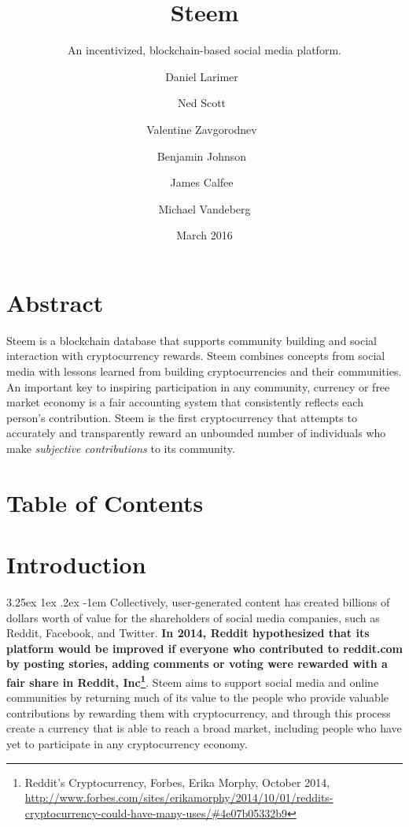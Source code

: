 \documentclass{article}
\title{Steem}
\subtitle{An incentivized, blockchain-based social media platform.}
\date{March 2016}
\author{
    Daniel Larimer\
    \and
    Ned Scott\
    \and
    Valentine Zavgorodnev\
    \and
    Benjamin Johnson\
    \and
    James Calfee\
    \and
    Michael Vandeberg
    }
\makeatletter
\renewcommand\paragraph{\@startsection{paragraph}{5}{\z@}%
  {3.25ex \@plus1ex \@minus.2ex}%
  {-1em}%
  {\normalfont\normalsize\bfseries}}
\makeatother
\begin{document}
    \renewcommand \thesection{\roman{section}}

    \maketitle

    \newpage

    \section{Abstract}

        Steem is a blockchain database that supports community building and
social interaction with cryptocurrency rewards. Steem combines concepts from
social media with lessons learned from building cryptocurrencies and their
communities. An important key to inspiring participation in any community,
currency or free market economy is a fair accounting system that
consistently reflects each person's contribution. Steem is the first
cryptocurrency that attempts to accurately and transparently reward an
unbounded number of individuals who make \textit{subjective contributions}
to its community.

    \newpage

    \section{Table of Contents}

    \tableofcontents

    \newpage

    \setcounter{section}{0}

    \renewcommand \thesection{\arabic{section}}

    \section{Introduction}

        \paragraph{}
            Collectively, user-generated content has created billions of
dollars worth of value for the shareholders of social media companies, such
as Reddit, Facebook, and Twitter. \textbf{In 2014, Reddit hypothesized that
its platform would be improved if everyone who contributed to reddit.com by
posting stories, adding comments or voting were rewarded with a fair share
in Reddit, Inc\footnote{Reddit's Cryptocurrency, Forbes, Erika Morphy,
October 2014,
\newline\url{http://www.forbes.com/sites/erikamorphy/2014/10/01/reddits-cryptocurrency-could-have-many-uses/\#4e07b05332b9}}}.
Steem aims to support social media and online communities by returning much
of its value to the people who provide valuable contributions by rewarding
them with cryptocurrency, and through this process create a currency that
is able to reach a broad market, including people who have yet to
participate in any cryptocurrency economy.
\end{document}
